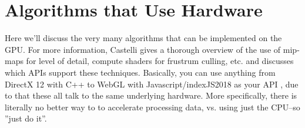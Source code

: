 \section{Algorithms that Use Hardware}
Here we'll discuss the very many algorithms that can be implemented on the GPU. For more information, Castelli
\cite{Castelli2018} gives a thorough overview of the use of mip-maps for level of detail, compute shaders for
frustrum culling, etc. and discusses which APIs support these techniques. Basically, you can use anything from
DirectX 12 with C++ to WebGL with Javascript/index{JS2018} as your API , due
to that these all talk to the same underlying hardware. More specifically, there is literally no better way to
to accelerate processing data, vs. using just the CPU--so ''just do it''.